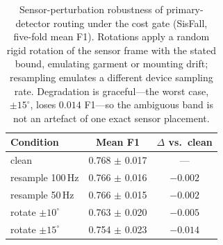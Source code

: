 \begin{table}[!t]
\centering
\caption{Sensor-perturbation robustness of primary-detector routing under the cost gate (SisFall, five-fold mean F1). Rotations apply a random rigid rotation of the sensor frame with the stated bound, emulating garment or mounting drift; resampling emulates a different device sampling rate. Degradation is graceful---the worst case, $\pm15^\circ$, loses $0.014$ F1---so the ambiguous band is not an artefact of one exact sensor placement.}
\label{tab:robustness}
\begin{tabular}{lcc}
\toprule
Condition & Mean F1 & $\Delta$ vs.\ clean \\
\midrule
clean             & 0.768 $\pm$ 0.017 & --- \\
resample 100\,Hz  & 0.766 $\pm$ 0.016 & $-0.002$ \\
resample 50\,Hz   & 0.766 $\pm$ 0.015 & $-0.002$ \\
rotate $\pm10^\circ$ & 0.763 $\pm$ 0.020 & $-0.005$ \\
rotate $\pm15^\circ$ & 0.754 $\pm$ 0.023 & $-0.014$ \\
\bottomrule
\end{tabular}
\end{table}
